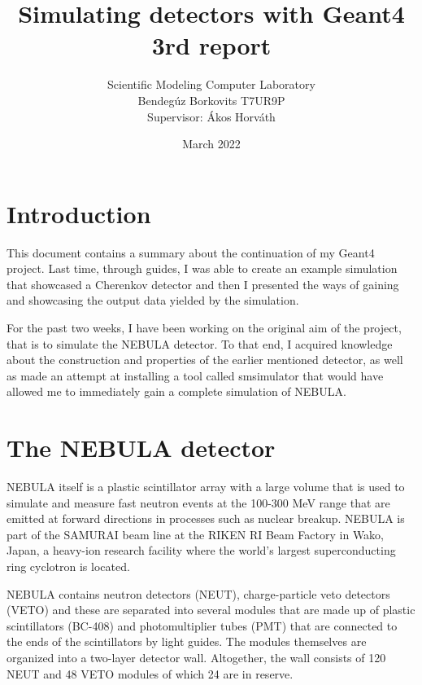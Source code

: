\documentclass[12pt,twocolumn]{article}
\title{Simulating detectors with Geant4 3rd report}
\author{Scientific Modeling Computer Laboratory\\Bendegúz Borkovits T7UR9P\\Supervisor: Ákos Horváth}
\date{March 2022}
\begin{document}
\maketitle

\section{Introduction}
This document contains a summary about the continuation of my Geant4 project. Last time, through guides, I was able to create an example simulation that showcased a Cherenkov detector and then I presented the ways of gaining and showcasing the output data yielded by the simulation.

For the past two weeks, I have been working on the original aim of the project, that is to simulate the NEBULA detector. To that end, I acquired knowledge about the construction and properties of the earlier mentioned detector, as well as made an attempt at installing a tool called smsimulator that would have allowed me to immediately gain a complete simulation of NEBULA.

\section{The NEBULA detector}

NEBULA itself is a plastic scintillator array with a large volume that is used to simulate and measure fast neutron events at the 100-300 MeV range that are emitted at forward directions in processes such as nuclear breakup. \cite{nebula} NEBULA is part of the SAMURAI beam line at the RIKEN RI Beam Factory in Wako, Japan, a heavy-ion research facility where the world's largest superconducting ring cyclotron is located. \cite{RI}

NEBULA contains neutron detectors (NEUT), charge-particle veto detectors (VETO) and these are separated into several modules that are made up of plastic scintillators (BC-408) and photomultiplier tubes (PMT) that are connected to the ends of the scintillators by light guides. The modules themselves are organized into a two-layer detector wall. Altogether, the wall consists of 120 NEUT and 48 VETO modules of which 24 are in reserve. \cite{nebula}
\end{document}
